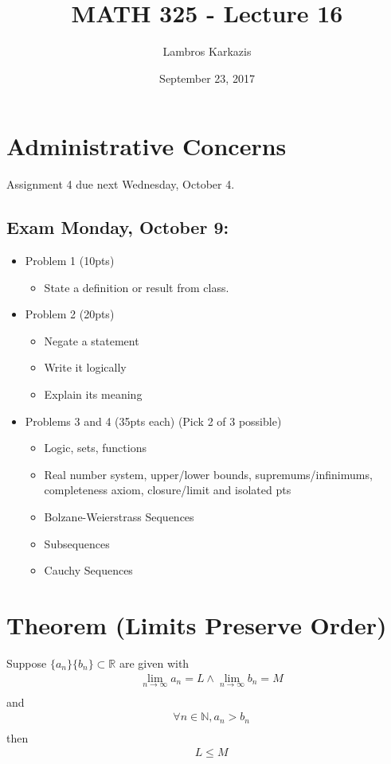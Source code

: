 \documentclass{article}
\title{MATH 325 - Lecture 16}
\author{Lambros Karkazis}
\date{September 23, 2017}
\begin{document}
\maketitle

\section{Administrative Concerns}
Assignment 4 due next Wednesday, October 4.\\
\subsection{Exam Monday, October 9:}
\begin{itemize}
\item Problem 1 (10pts)
\begin{itemize}
\item State a definition or result from class.
\end{itemize}
\item Problem 2 (20pts)
\begin{itemize}
\item Negate a statement
\item Write it logically
\item Explain its meaning
\end{itemize}
\item Problems 3 and 4 (35pts each) (Pick 2 of 3 possible)
\begin{itemize}
\item Logic, sets, functions
\item Real number system, upper/lower bounds, supremums/infinimums, completeness axiom, closure/limit and isolated pts
\item Bolzane-Weierstrass Sequences
\item Subsequences
\item Cauchy Sequences
\end{itemize}
\end{itemize}
\section{Theorem (Limits Preserve Order)}
Suppose $\{a_n\} \{b_n\} \subset \mathbb{R}$ are given with
\begin{align*}
 	& \lim_{n \rightarrow \infty}a_n = L \wedge \lim_{n \rightarrow \infty}b_n = M  \\
\end{align*}
and
\begin{align*}
 	& \forall n \in \mathbb{N}, a_n > b_n \\
\end{align*}
then
\begin{align*}
 	& L \leq M
\end{align*}
\end{document}
